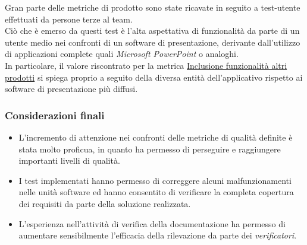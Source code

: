 \FloatBarrier
Gran parte delle metriche di prodotto sono state ricavate in seguito a test-utente effettuati da persone terze al team.\\
Ciò che è emerso da questi test è l'alta aspettativa di funzionalità da parte di un utente medio nei confronti di un software di presentazione, derivante dall'utilizzo di applicazioni complete quali \textit{Microsoft PowerPoint} o analoghi.\\
In particolare, il valore riscontrato per la metrica \hyperref[inclFunzAltriProd]{Inclusione funzionalità altri prodotti} si spiega proprio a seguito della diversa entità dell'applicativo \Premi rispetto ai software di presentazione più diffusi.
\subsubsection{Considerazioni finali}
\begin{itemize}
\item L'incremento di attenzione nei confronti delle metriche di qualità definite è stata molto proficua, in quanto ha permesso di perseguire e raggiungere importanti livelli di qualità.
\item I test implementati hanno permesso di correggere alcuni malfunzionamenti nelle unità software ed hanno consentito di verificare la completa copertura dei requisiti da parte della soluzione realizzata.
\item L'esperienza nell'attività di verifica della documentazione ha permesso di aumentare sensibilmente l'efficacia della rilevazione da parte dei \textit{verificatori}.
\end{itemize}